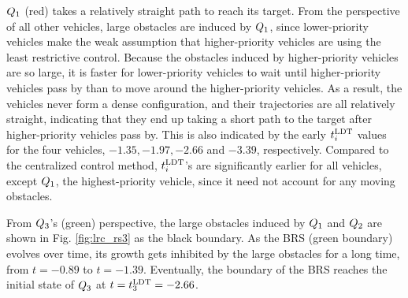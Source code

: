 $Q_1$ (red) takes a relatively straight path to reach its target. From the perspective of all other vehicles, large obstacles are induced by $Q_1$, since lower-priority vehicles make the weak assumption that higher-priority vehicles are using the least restrictive control. Because the obstacles induced by higher-priority vehicles are so large, it is faster for lower-priority vehicles to wait until higher-priority vehicles pass by than to move around the higher-priority vehicles. As a result, the vehicles never form a dense configuration, and their trajectories are all relatively straight, indicating that they end up taking a short path to the target after higher-priority vehicles pass by. This is also indicated by the early $t^\text{LDT}_i$ values for the four vehicles, $-1.35, -1.97, -2.66$ and $-3.39$, respectively. Compared to the centralized control method, $t^\text{LDT}_i$'s are significantly earlier for all vehicles, except $Q_1$, the highest-priority vehicle, since it need not account for any moving obstacles. 

From $Q_3$'s (green) perspective, the large obstacles induced by $Q_1$ and $Q_2$ are shown in Fig. \ref{fig:lrc_rs3} as the black boundary. As the BRS (green boundary) evolves over time, its growth gets inhibited by the large obstacles for a long time, from $t=-0.89$ to $t=-1.39$. Eventually, the boundary of the BRS reaches the initial state of $Q_3$ at $t = t^\text{LDT}_3 = -2.66$.

